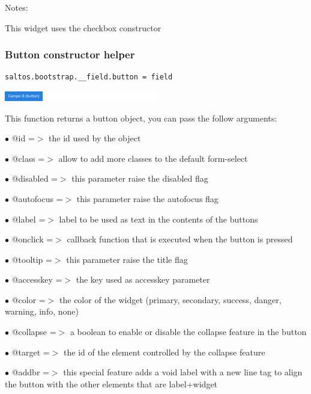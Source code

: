 \documentclass[a4paper]{article}
\begin{document}
Notes:

This widget uses the checkbox constructor

\hypertarget{toc67}{}
\subsubsection{Button constructor helper}

\begin{lstlisting}
saltos.bootstrap.__field.button = field
\end{lstlisting}

\begin{center}\includegraphics[width=0.5\textwidth]{../ujest/snaps/test-bootstrap-js-bootstrap-campo-8-button-1-snap.png}\end{center}

This function returns a button object, you can pass the follow arguments:

\begin{compactitem}
\item[\color{myblue}$\bullet$] @id        =$>$ the id used by the object
\item[\color{myblue}$\bullet$] @class     =$>$ allow to add more classes to the default form-select
\item[\color{myblue}$\bullet$] @disabled  =$>$ this parameter raise the disabled flag
\item[\color{myblue}$\bullet$] @autofocus =$>$ this parameter raise the autofocus flag
\item[\color{myblue}$\bullet$] @label     =$>$ label to be used as text in the contents of the buttons
\item[\color{myblue}$\bullet$] @onclick   =$>$ callback function that is executed when the button is pressed
\item[\color{myblue}$\bullet$] @tooltip   =$>$ this parameter raise the title flag
\item[\color{myblue}$\bullet$] @accesskey =$>$ the key used as accesskey parameter
\item[\color{myblue}$\bullet$] @color     =$>$ the color of the widget (primary, secondary, success, danger, warning, info, none)
\item[\color{myblue}$\bullet$] @collapse  =$>$ a boolean to enable or disable the collapse feature in the button
\item[\color{myblue}$\bullet$] @target    =$>$ the id of the element controlled by the collapse feature
\item[\color{myblue}$\bullet$] @addbr     =$>$ this special feature adds a void label with a new line tag to align the button with
              the other elements that are label+widget
\end{compactitem}
\end{document}
